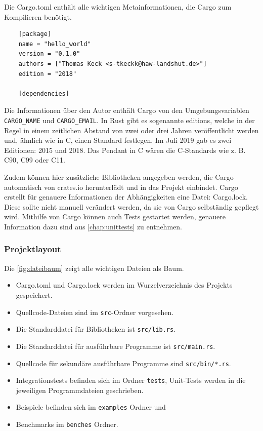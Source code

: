 Die Cargo.toml enthält alle wichtigen Metainformationen, die Cargo zum Kompilieren benötigt. 

\begin{lstlisting}
    [package]
    name = "hello_world"
    version = "0.1.0"
    authors = ["Thomas Keck <s-tkeckk@haw-landshut.de>"]
    edition = "2018"
    
    [dependencies]    
\end{lstlisting}

Die Informationen über den Autor enthält Cargo von den Umgebungsvariablen \verb"CARGO_NAME" und \verb"CARGO_EMAIL". In Rust gibt es sogenannte editions, welche in der Regel in einem zeitlichen Abstand von zwei oder drei Jahren veröffentlicht werden und, ähnlich wie in C, einen Standard festlegen. Im Juli 2019 gab es zwei Editionen: 2015 und 2018. Das Pendant in C wären die C-Standards wie z. B. C90, C99 oder C11.

Zudem können hier zusätzliche Bibliotheken angegeben werden, die Cargo automatisch von crates.io herunterlädt und in das Projekt einbindet. Cargo erstellt für genauere Informationen der Abhängigkeiten eine Datei: Cargo.lock. Diese sollte nicht manuell verändert werden, da sie von Cargo selbständig gepflegt wird. Mithilfe von Cargo können auch Tests gestartet werden, genauere Information dazu sind aus \autoref{chap:unittests} zu entnehmen.

\subsubsection{Projektlayout}

Die \autoref{fig:dateibaum} zeigt alle wichtigen Dateien als Baum.

\begin{itemize}
    \item Cargo.toml und Cargo.lock werden im Wurzelverzeichnis des Projekts gespeichert.
    \item Quellcode-Dateien sind im \verb"src"-Ordner vorgesehen.
    \item Die Standarddatei für Bibliotheken ist \verb"src/lib.rs".
    \item Die Standarddatei für ausführbare Programme ist \verb"src/main.rs".
    \item Quellcode für sekundäre ausführbare Programme sind \verb"src/bin/*.rs".
    \item Integrationstests befinden sich im Ordner \verb"tests", Unit-Tests werden in die jeweiligen Programmdateien geschrieben.
    \item Beispiele befinden sich im \verb"examples" Ordner und
    \item Benchmarks im \verb"benches" Ordner.
\end{itemize}

